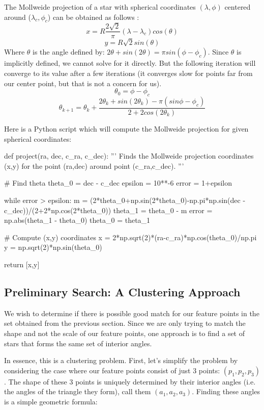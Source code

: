 \documentclass[paper=a4, fontsize=11pt]{scrartcl} %
\begin{document}
The Mollweide projection of a star with spherical coordinates $(\lambda,\phi)$ centered around ($\lambda_c,\phi_c$) can be obtained as follows \cite{Snyder1987}:
$$
x = R\frac{2\sqrt{2}}{\pi}(\lambda-\lambda_c)cos(\theta)$$$$
y = R\sqrt{2}sin(\theta)
$$
Where $\theta$ is the angle defined by: $2\theta + sin(2\theta)=\pi sin(\phi-\phi_c)$.  Since $\theta$ is implicitly defined, we cannot solve for it directly. But the following iteration will converge to its value after a few iterations (it converges slow for points far from our center point, but that is not a concern for us).
$$
\theta_0 = \phi-\phi_c
$$$$
\theta_{k+1} = \theta_k + \frac{2\theta_k+sin(2\theta_k)-\pi(sin\phi-\phi_c)}{2+2cos(2\theta_k)}
$$

Here is a Python script which will compute the Mollweide projection for given spherical coordinates:
\begin{python}

def project(ra, dec, c_ra, c_dec):
	'''
	Finds the Mollweide projection coordinates (x,y) for the point (ra,dec) around 
	point (c_ra,c_dec).
	'''
	
	# Find theta
	theta_0 = dec - c_dec
	epsilon = 10**-6
	error = 1+epsilon
	
	while error > epsilon:
	    m = (2*theta_0+np.sin(2*theta_0)-np.pi*np.sin(dec - c_dec))/(2+2*np.cos(2*theta_0))
	    theta_1 = theta_0 - m
	    error = np.abs(theta_1 - theta_0)
	    theta_0 = theta_1
	
	# Compute (x,y) coordinates
	x = 2*np.sqrt(2)*(ra-c_ra)*np.cos(theta_0)/np.pi
	y = np.sqrt(2)*np.sin(theta_0)
	
	return [x,y]
\end{python}


\subsection{Preliminary Search: A Clustering Approach}
We wish to determine if there is possible good match for our feature points in the set obtained from the previous section.  Since we are only trying to match the shape and not the scale of our feature points, one approach is to find a set of stars that forms the same set of interior angles.

In essence, this is a clustering problem. First, let's simplify the problem by considering the case where our feature points consist of just 3 points: $(p_1,p_2,p_3)$. The shape of these 3 points is uniquely determined by their interior angles (i.e. the angles of the triangle they form), call them $(a_1,a_2,a_3)$. Finding these angles is a simple geometric formula:
\end{document}
